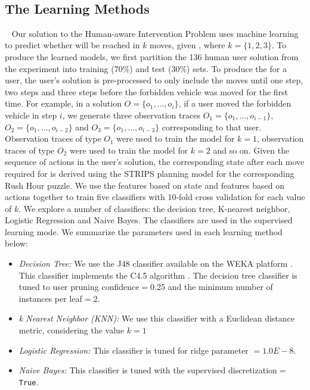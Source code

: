 ~\subsection{The Learning Methods}
~\label{sec:learningmethods}
Our solution to the Human-aware Intervention Problem uses machine learning to predict whether \undesired will be reached in $k$ moves, given \historyDef, where $k=\lbrace 1,2,3\rbrace$.
To produce the learned models, we first partition the 136 human user solution from the experiment into training (70\%) and test (30\%) sets. 
To produce the \historyDef for a user, the user's solution is pre-processed to only include the moves until one step, two steps and three steps before the forbidden vehicle was moved for the first time. 
For example, in a  solution $O=\lbrace o_1, \ldots, o_i\rbrace$, if a user moved the forbidden vehicle in step $i$, we generate three observation traces $O_1=\lbrace o_1, \ldots, o_{i-1}\rbrace$, $O_2=\lbrace o_1, \ldots, o_{i-2}\rbrace$ and $O_3=\lbrace o_1, \ldots, o_{i-3}\rbrace$ corresponding to that user. 
Observation traces of type $O_1$ were used to train the model for $k=1$, observation traces of type $O_2$ were used to train the model for $k=2$ and so on.
Given the sequence of actions in the user's solution, the corresponding state after each move required for \historyDef is derived using the STRIPS planning model for the corresponding Rush Hour puzzle.
We use the features based on state and features based on actions together to train five classifiers with 10-fold cross validation for each value of $k$. 
We explore a number of classifiers: the decision tree, K-nearest neighbor, Logistic Regression and Naive Bayes. 
The classifiers are used in the supervised learning mode. 
We summarize the parameters used in each learning method below:
\begin{itemize}
\item \textit{Decision Tree:} We use the J48 classifier available on the WEKA platform \cite{hall09}. This classifier implements the C4.5 algorithm \cite{quinlan1993c45}. The decision tree classifier is tuned to user pruning confidence$=$0.25 and the minimum number of instances per leaf$=$2.
\item \textit{k Nearest Neighbor (KNN):} We use this classifier with a Euclidean distance metric, considering the value $k=1$
\item \textit{Logistic Regression:} This classifier is tuned for ridge parameter $= 1.0E-8$.
\item \textit{Naive Bayes:} This classifier is tuned with the supervised discretization$=$\texttt{True}.
\end{itemize}


